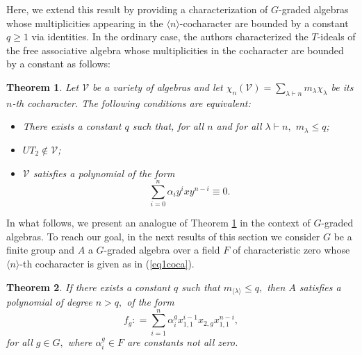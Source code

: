 \documentclass{amsart}
\newtheorem{teorema}{Theorem}[section]
\numberwithin{equation}{section}
\begin{document}
Here, we extend this result by providing a characterization of $G$-graded algebras whose multiplicities appearing in the $\langle n \rangle$-cocharacter  are bounded by a constant $q\ge 1$ via identities. In the ordinary case, the authors characterized the $T$-ideals of the free associative algebra whose multiplicities
in the cocharacter are bounded by a constant as follows: 

\begin{teorema}\cite{MRZ}\label{teoMRZ}
Let $\mathcal{V}$ be a variety of algebras and let $\chi_n(\mathcal{V}) = \sum\limits_{\lambda\vdash n}m_{\lambda}\chi_{\lambda}$ 
be its $n$-th cocharacter. The following conditions are equivalent:

\begin{itemize}
    \item[1)] There exists a constant $q$ such that, for all $n$ and for all $\lambda \vdash n,$  $m_\lambda \le q$; 
    \item[2)] $UT_2 \notin \mathcal{V}$;
    \item[3)] 
$\mathcal{V}$ satisfies a polynomial of the form 
$$\sum\limits_{i=0}^n\alpha_iy^ixy^{n-i}\equiv 0.$$
\end{itemize}
\end{teorema}

 In what follows, we present an analogue of Theorem \ref{teoMRZ} in the context of $G$-graded algebras. To reach our goal, in the next results of this section we consider  $G$ be a finite group and $A$ a $G$-graded algebra over a field $F$ of characteristic zero whose $\langle n \rangle$-th cocharacter is given as in  (\ref{eq1coca}).


\begin{teorema}\label{teoGmult}
 If there exists a constant $q$ such that $m_{\langle \lambda \rangle} \le q,$ then $A$ satisfies a polynomial of degree $n>q,$ of the form 
\begin{equation}\label{eqGid}f_g: = \sum\limits_{i=1}^n\alpha_i^gx^{i-1}_{1,1}x_{2,g}x^{n-i}_{1,1},\end{equation} for all  $g\in G,$ where $\alpha_i^g \in F$  are constants not all zero.
\end{teorema}
\end{document}

